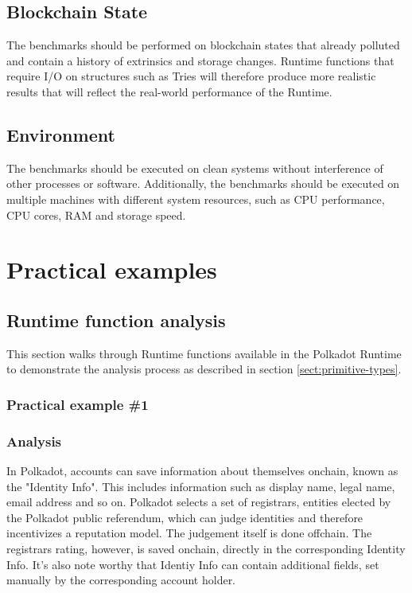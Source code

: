 \documentclass[11pt,a4paper]{article}
\begin{document}
\subsection{Blockchain State}
The benchmarks should be performed on blockchain states that already polluted
and contain a history of extrinsics and storage changes. Runtime functions that
require I/O on structures such as Tries will therefore produce more realistic
results that will reflect the real-world performance of the Runtime.

\subsection{Environment}
The benchmarks should be executed on clean systems without interference of other
processes or software. Additionally, the benchmarks should be executed on
multiple machines with different system resources, such as CPU performance, CPU
cores, RAM and storage speed.

\section{Practical examples}\label{sec:practical-examples}

\subsection{Runtime function analysis}

This section walks through Runtime functions available in the Polkadot Runtime
to demonstrate the analysis process as described in section
\ref{sect:primitive-types}.

\subsubsection{Practical example \#1}

\subsubsection*{Analysis}

In Polkadot, accounts can save information about themselves onchain, known as
the "Identity Info". This includes information such as display name, legal name,
email address and so on. Polkadot selects a set of registrars, entities elected
by the Polkadot public referendum, which can judge identities and therefore
incentivizes a reputation model. The judgement itself is done offchain. The
registrars rating, however, is saved onchain, directly in the corresponding
Identity Info. It's also note worthy that Identiy Info can contain additional
fields, set manually by the corresponding account holder.
\newline
\end{document}
